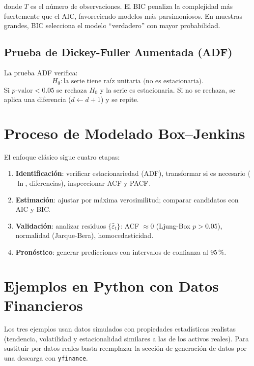 \documentclass[12pt,a4paper]{article}
\begin{document}
donde $T$ es el número de observaciones. El BIC penaliza la complejidad más fuertemente
que el AIC, favoreciendo modelos más parsimoniosos. En muestras grandes, BIC selecciona
el modelo ``verdadero'' con mayor probabilidad.

\subsection{Prueba de Dickey-Fuller Aumentada (ADF)}

La prueba ADF verifica:
\[
  H_0\colon \text{la serie tiene raíz unitaria (no es estacionaria)}.
\]
Si $p\text{-valor} < 0.05$ se rechaza $H_0$ y la serie es estacionaria.
Si no se rechaza, se aplica una diferencia ($d \leftarrow d+1$) y se repite.

\section{Proceso de Modelado Box--Jenkins}

El enfoque clásico sigue cuatro etapas:

\begin{enumerate}
  \item \textbf{Identificación}: verificar estacionariedad (ADF), transformar si es
        necesario ($\ln$, diferencias), inspeccionar ACF y PACF.
  \item \textbf{Estimación}: ajustar por máxima verosimilitud; comparar candidatos con
        AIC y BIC.
  \item \textbf{Validación}: analizar residuos $\{\hat{\varepsilon}_t\}$:
        ACF $\approx 0$ (Ljung-Box $p>0.05$), normalidad (Jarque-Bera),
        homocedasticidad.
  \item \textbf{Pronóstico}: generar predicciones con intervalos de confianza al 95\,\%.
\end{enumerate}

\section{Ejemplos en Python con Datos Financieros}

Los tres ejemplos usan datos simulados con propiedades estadísticas realistas
(tendencia, volatilidad y estacionalidad similares a las de los activos reales).
Para sustituir por datos reales basta reemplazar la sección de generación de datos
por una descarga con \texttt{yfinance}.
\end{document}
